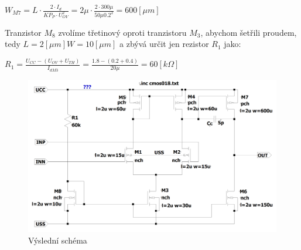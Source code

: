 \begin{center}
    \large
    \(
        W_{M7} = L \cdot \frac{2 \cdot I_d}{KP_P \cdot U_{OV}^2} = 2\mu \cdot \frac{2 \cdot 300\mu}{50\mu 0.2^2} = 600 [\mu m]
    \)
\end{center}

Tranzistor \(M_8\) zvolíme třetinový oproti tranzistoru \(M_3\), abychom šetřili proudem, tedy \(L=2 [\mu m] W=10[\mu m]\) a zbývá určit jen rezistor \(R_1\) jako:

\begin{center}
    \Large
    \(
        R_1 = \frac{U_{CC}-(U_{OV}+U_{TH})}{I_{dM3}} = \frac{1.8 - (0.2+0.4)}{20\mu} = 60 [k\Omega]
    \)
\end{center}

\begin{figure}[h!]
    \centering
    \includegraphics[width=\textwidth]{text/img/Shrnuti_sschematem.png}
    \caption{\label{fig:res-sch} Výslední schéma}
\end{figure}

